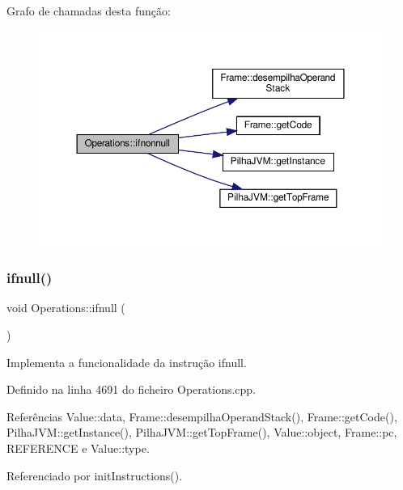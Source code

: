 Grafo de chamadas desta função\+:
\nopagebreak
\begin{figure}[H]
\begin{center}
\leavevmode
\includegraphics[width=350pt]{classOperations_a00af7ab198690f5d3e6c7f2b2d374194_cgraph}
\end{center}
\end{figure}
\mbox{\label{classOperations_a030f5995f8f357254e543d0cbce2d189}} 
\subsubsection{\texorpdfstring{ifnull()}{ifnull()}}
{\footnotesize\ttfamily void Operations\+::ifnull (\begin{DoxyParamCaption}{ }\end{DoxyParamCaption})\hspace{0.3cm}{\ttfamily [private]}}



Implementa a funcionalidade da instrução ifnull. 



Definido na linha 4691 do ficheiro Operations.\+cpp.



Referências Value\+::data, Frame\+::desempilha\+Operand\+Stack(), Frame\+::get\+Code(), Pilha\+J\+V\+M\+::get\+Instance(), Pilha\+J\+V\+M\+::get\+Top\+Frame(), Value\+::object, Frame\+::pc, R\+E\+F\+E\+R\+E\+N\+CE e Value\+::type.



Referenciado por init\+Instructions().


